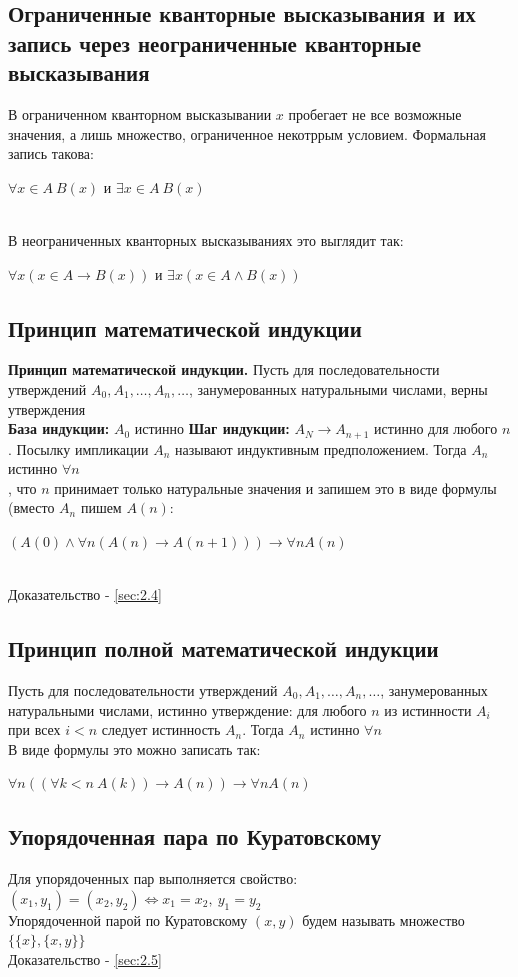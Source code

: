 \documentclass[a4paper]{article}
\begin{document}
\subsection{Ограниченные кванторные высказывания и их запись через неограниченные кванторные высказывания}
В ограниченном кванторном высказывании $x$ пробегает не все возможные значения, а лишь множество, ограниченное некотррым условием. Формальная запись такова:\\[2mm]
\centerline{$\forall x\in A\ B(x)$ и $\exists x\in A\ B(x)$}\\[2mm]
\indent В неограниченных кванторных высказываниях это выглядит так: \\[2mm]
\centerline{$\forall x(x\in A\rightarrow B(x))$ и $\exists x(x\in A\wedge B(x))$}
\subsection{Принцип математической индукции}
\label{sec:1.14}\textbf{Принцип математической индукции.} Пусть для последовательности утверждений $A_0, A_1,\ldots, A_n, \ldots$, занумерованных натуральными числами, верны утверждения\\[2mm]
\indent \textbf{База индукции:} $A_0$ истинно
\indent \textbf{Шаг индукции:} $A_N\rightarrow A_{n+1}$ истинно для любого $n$. Посылку импликации $A_n$ называют индуктивным предположением. Тогда $A_n$ истинно $\forall n$\\[2mm]
, что $n$ принимает только натуральные значения и запишем это в виде формулы (вместо $A_n$ пишем $A(n)$:\\[2mm]
\centerline{$(A(0)\wedge\forall n(A(n)\rightarrow A(n+1)))\rightarrow\forall nA(n)$}\\[2mm]
Доказательство - \ref{sec:2.4}
\subsection{Принцип полной математической индукции}
\label{sec:1.15}Пусть для последовательности утверждений $A_0, A_1, \ldots, A_n, \ldots$, занумерованных натуральными числами, истинно утверждение: \guillemotleft для любого $n$ из истинности $A_i$ при всех $i<n$ следует истинность $A_n$\guillemotright. Тогда $A_n$ истинно $\forall n$\\[2mm]
\indent В виде формулы это можно записать так: \\[2mm]
\centerline{$\forall n((\forall k<n\ A(k))\rightarrow A(n))\rightarrow\forall nA(n)$}
\subsection{Упорядоченная пара по Куратовскому}
\label{sec:1.16}Для упорядоченных пар выполняется свойство: $(x_1, y_1)=(x_2,y_2)\Leftrightarrow x_1=x_2,\ y_1=y_2$\\[2mm]
Упорядоченной парой по Куратовскому $(x,y)$ будем называть
множество $\{\{x\},\{x,y\}\}$\\[2mm]
Доказательство - \ref{sec:2.5}
\end{document}
